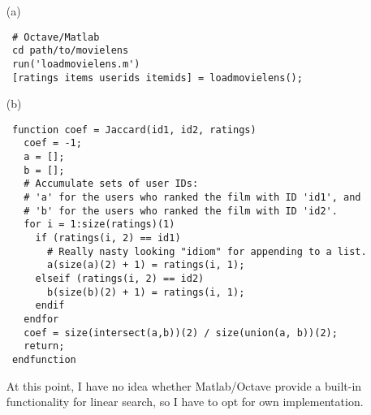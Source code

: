 \documentclass[10pt]{article}
\begin{document}
\begin{itemize}
 \item[(a)] 
 \begin{verbatim}
 # Octave/Matlab
 cd path/to/movielens
 run('loadmovielens.m')
 [ratings items userids itemids] = loadmovielens();
 \end{verbatim}
 
 \item[(b)]
 \begin{verbatim}
 function coef = Jaccard(id1, id2, ratings)
   coef = -1;
   a = [];
   b = [];
   # Accumulate sets of user IDs:
   # 'a' for the users who ranked the film with ID 'id1', and
   # 'b' for the users who ranked the film with ID 'id2'.
   for i = 1:size(ratings)(1)
     if (ratings(i, 2) == id1)
       # Really nasty looking "idiom" for appending to a list.
       a(size(a)(2) + 1) = ratings(i, 1);
     elseif (ratings(i, 2) == id2)
       b(size(b)(2) + 1) = ratings(i, 1);
     endif 
   endfor
   coef = size(intersect(a,b))(2) / size(union(a, b))(2);
   return;
 endfunction
 \end{verbatim}
 
 At this point, I have no idea whether Matlab/Octave provide a built-in functionality for linear search, so I have to opt for own implementation.
\end{itemize}
\end{document}
